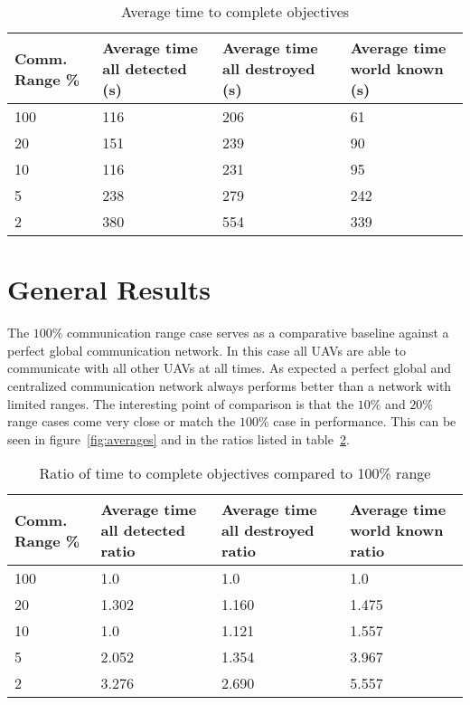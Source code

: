 \begin{table}[H]
	\caption{Average time to complete objectives}
	\centering
	\label{tab:avgResults}
	\begin{tabular}{|p{1.25cm}|p{1.5cm}|p{1.75cm}|p{1.5cm}|}
		\hline
		Comm. Range \% & Average time all detected (s) & Average time all destroyed (s) & Average time world known (s)\\
		\hline
		100 & 116 & 206 & 61  \\ \hline
		20  & 151 & 239 & 90  \\ \hline
		10  & 116 & 231 & 95  \\ \hline
		5   & 238 & 279 & 242 \\ \hline
		2   & 380 & 554 & 339 \\ \hline
	\end{tabular}
\end{table}

\section{General Results}

The $100\%$ communication range case serves as a comparative baseline against a perfect global communication network.  In this case all UAVs are able to communicate with all other UAVs at all times.  As expected a perfect global and centralized communication network always performs better than a network with limited ranges.  The interesting point of comparison is that the $10\%$ and $20\%$ range cases come very close or match the $100\%$ case in performance.  This can be seen in figure~\ref{fig:averages} and in the ratios listed in table~\ref{tab:avgResultsRatio}.

\begin{table}[H]
	\caption{Ratio of time to complete objectives compared to 100\% range}
	\centering
	\label{tab:avgResultsRatio}
	\begin{tabular}{|p{1.25cm}|p{1.5cm}|p{1.75cm}|p{1.5cm}|}
		\hline
		Comm. Range \% & Average time all detected ratio & Average time all destroyed ratio & Average time world known ratio\\
		\hline
		100 & 1.0   & 1.0   & 1.0  \\ \hline
		20  & 1.302 & 1.160 & 1.475  \\ \hline
		10  & 1.0   & 1.121 & 1.557  \\ \hline
		5   & 2.052 & 1.354 & 3.967 \\ \hline
		2   & 3.276 & 2.690 & 5.557 \\ \hline
	\end{tabular}
\end{table}

